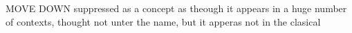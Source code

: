 MOVE DOWN suppressed as a concept as theough it appears in a huge number of contexts, thought not unter the name, but it apperas not in the clasical

